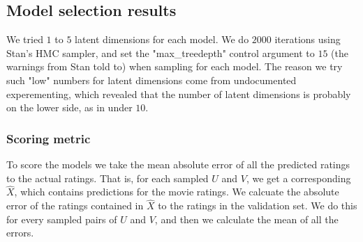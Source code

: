 \documentclass[12pt]{article}
\begin{document}
    \subsection{Model selection results}
    We tried $1$ to $5$ latent dimensions for each model. We do $2000$ iterations using Stan's HMC sampler, and set the "max\_treedepth" control argument to $15$ (the warnings from Stan told to) when sampling for each model. The reason we try such "low" numbers for latent dimensions come from undocumented experementing, which revealed that the number of latent dimensions is probably on the lower side, as in under $10$.

        \subsubsection*{Scoring metric}
        To score the models we take the mean absolute error of all the predicted ratings to the actual ratings. That is, for each sampled $U$ and $V$, we get a corresponding $\hat{X}$, which contains predictions for the movie ratings. We calcuate the absolute error of the ratings contained in $\hat{X}$ to the ratings in the validation set. We do this for every sampled pairs of $U$ and $V$, and then we calculate the mean of all the errors. 
\end{document}
